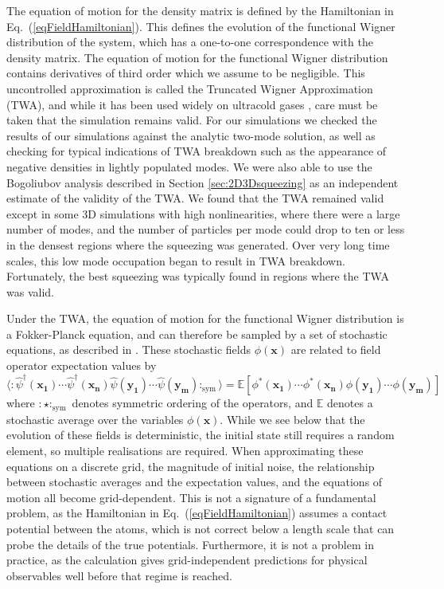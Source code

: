 \documentclass{iopart}
\begin{document}
The equation of motion for the density matrix is defined by the Hamiltonian in Eq.~(\ref{eqFieldHamiltonian}).  This defines the evolution of the functional Wigner distribution of the system, which has a one-to-one correspondence with the density matrix.  The equation of motion for the functional Wigner distribution contains derivatives of third order which we assume to be negligible.  This uncontrolled approximation is called the Truncated Wigner Approximation (TWA), and while it has been used widely on ultracold gases \cite{johnssonET2007,haineET2009,steelET1998,dennisET2010,johnssonHope:2007}, care must be taken that the simulation remains valid. For our simulations we checked the results of our simulations against the analytic two-mode solution, as well as checking for typical indications of TWA breakdown such as the appearance of negative densities in lightly populated modes.  We were also able to use the Bogoliubov analysis described in Section \ref{sec:2D3Dsqueezing} as an independent estimate of the validity of the TWA.  We found that the TWA remained valid except in some 3D simulations with high nonlinearities, where there were a large number of modes, and the number of particles per mode could drop to ten or less in the densest regions where the squeezing was generated. Over very long time scales, this low mode occupation began to result in TWA breakdown.  Fortunately, the best squeezing was typically found in regions where the TWA was valid.

Under the TWA, the equation of motion for the functional Wigner distribution is a Fokker-Planck equation, and can therefore be sampled by a set of stochastic equations, as described in \cite{gardiner1991}.  These stochastic fields $\phi(\mathbf{x})$ are related to field operator expectation values by  
\begin{equation}
\langle :\hat{\psi}^\dagger(\mathbf{x_1})\cdots\hat{\psi}^\dagger(\mathbf{x_n})\hat{\psi}(\mathbf{y_1})\cdots\hat{\psi}(\mathbf{y_m}):_{\mbox{sym}}\rangle = \mathbb{E}\left[\phi^*(\mathbf{x_1})\cdots\phi^*(\mathbf{x_n})\phi(\mathbf{y_1})\cdots\phi(\mathbf{y_m})\right]
\label{eqExpectationRelations}
\end{equation}
%
where $:\star:_{\mbox{sym}}$ denotes symmetric ordering of the operators, and $\mathbb{E}$ denotes a stochastic average over the variables $\phi(\mathbf{x})$.  While we see below that the evolution of these fields is deterministic, the initial state still requires a random element, so multiple realisations are required.  When approximating these equations on a discrete grid, the magnitude of initial noise, the relationship between stochastic averages and the expectation values, and the equations of motion all become grid-dependent.  This is not a signature of a fundamental problem, as the Hamiltonian in Eq.~(\ref{eqFieldHamiltonian}) assumes a contact potential between the atoms, which is not correct below a length scale that can probe the details of the true potentials.  Furthermore, it is not a problem in practice, as the calculation gives grid-independent predictions for physical observables well before that regime is reached.
\end{document}
